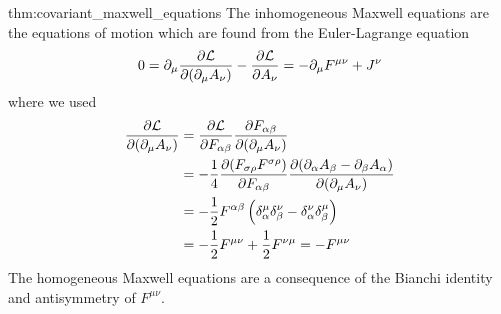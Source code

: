 \begin{delayedproof}{thm:covariant_maxwell_equations}
	The inhomogeneous Maxwell equations are the equations of motion which are found from the Euler-Lagrange equation
	\begin{equation*}
		0
		=
		\partial_\mu
		\pdv{\mathcal{L}}{(\partial_\mu A_\nu)}
		-
		\pdv{\mathcal{L}}{A_\nu}
		=
		-
		\partial_\mu
		F^{\mu\nu}
		+
		J^\nu
	\end{equation*}
	where we used
	\begin{equation*}
		\begin{split}
			\pdv{\mathcal{L}}{(\partial_\mu A_\nu)}
			&=
			\pdv{\mathcal{L}}{F_{\alpha\beta}}
			\pdv{F_{\alpha\beta}}{(\partial_\mu A_\nu)}
			\\
			&=
			-
			\frac{1}{4}
			\pdv{(F_{\sigma\rho}F^{\sigma\rho})}{F_{\alpha\beta}}
			\pdv{(\partial_\alpha A_\beta-\partial_\beta A_\alpha)}{(\partial_\mu A_\nu)}
			\\
			&=
			-
			\frac{1}{2}
			F^{\alpha\beta}
			\left(
				\delta_\alpha^\mu
				\delta_\beta^\nu
				-
				\delta_\alpha^\nu
				\delta_\beta^\mu
			\right)
			\\
			&=
			-
			\frac{1}{2}
			F^{\mu\nu}
			+
			\frac{1}{2}
			F^{\nu\mu}
			=
			-
			F^{\mu\nu}			
		\end{split}
	\end{equation*}
	The homogeneous Maxwell equations are a consequence of the Bianchi identity and antisymmetry of $F^{\mu\nu}$.
\end{delayedproof}


